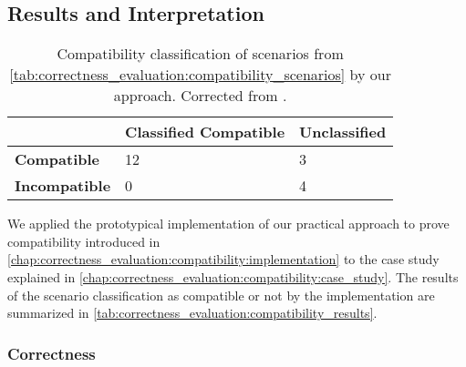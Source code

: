\subsection{Results and Interpretation}

\begin{table}
    \centering
    \small
    \renewcommand{\arraystretch}{1.2}%
    \setlength\tabcolsep{4 pt}
    \begin{tabular}{L{2cm} C{3.5cm} C{2.3cm}}
        \toprule
         & \textbf{Classified Compatible} & \textbf{Unclassified} \\
         \midrule
         \textbf{Compatible} & 12 & 3\\
         \textbf{Incompatible} & 0 & 4\\
         \bottomrule
    \end{tabular}
    \caption[Correctness of compatibility classification results]{Compatibility classification of scenarios from \autoref{tab:correctness_evaluation:compatibility_scenarios} by our approach. Corrected from .}
    \label{tab:correctness_evaluation:compatibility_results}
\end{table}

We applied the prototypical implementation of our practical approach to prove compatibility introduced in \autoref{chap:correctness_evaluation:compatibility:implementation} to the case study explained in \autoref{chap:correctness_evaluation:compatibility:case_study}.
The results of the scenario classification as compatible or not by the implementation are summarized in \autoref{tab:correctness_evaluation:compatibility_results}.


\subsubsection{Correctness}

